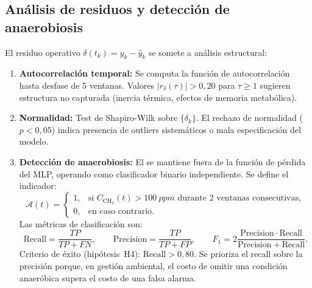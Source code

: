 \subsection{Análisis de residuos y detección de anaerobiosis}

El residuo operativo $\delta(t_k) = y_k - \hat{y}_k$ se somete a análisis estructural:

\begin{enumerate}
\item \textbf{Autocorrelación temporal:} Se computa la función de autocorrelación hasta desfase de 5 ventanas. Valores $|r_{\delta}(\tau)| > 0{,}20$ para $\tau \geq 1$ sugieren estructura no capturada (inercia térmica, efectos de memoria metabólica).
\item \textbf{Normalidad:} Test de Shapiro-Wilk sobre $\{\delta_k\}$. El rechazo de normalidad ($p < 0{,}05$) indica presencia de outliers sistemáticos o mala especificación del modelo.
\item \textbf{Detección de anaerobiosis:} El  se mantiene fuera de la función de pérdida del MLP, operando como clasificador binario independiente. Se define el indicador:
\begin{equation}
\mathcal{A}(t) =
\begin{cases}
1, & \text{si } C_{\mathrm{CH_4}}(t) > \SI{100}{ppm} \text{ durante 2 ventanas consecutivas}, \\
0, & \text{en caso contrario}.
\end{cases}
\end{equation}
Las métricas de clasificación son:
\begin{equation}
\mathrm{Recall} = \frac{TP}{TP+FN},
\qquad
\mathrm{Precision} = \frac{TP}{TP+FP},
\qquad
F_1 = 2\frac{\mathrm{Precision}\cdot\mathrm{Recall}}{\mathrm{Precision}+\mathrm{Recall}}.
\end{equation}
Criterio de éxito (hipótesis~H4): $\mathrm{Recall} > 0{,}80$. Se prioriza el recall sobre la precisión porque, en gestión ambiental, el costo de omitir una condición anaeróbica supera el costo de una falsa alarma.
\end{enumerate}
